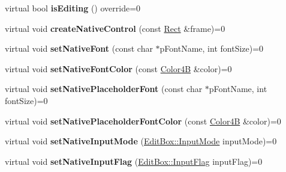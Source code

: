\begin{DoxyCompactItemize}
\item 
\mbox{\label{classui_1_1EditBoxImplCommon_adfce3b9c52fb6bcb411883ca93276c2e}} 
virtual bool {\bfseries is\+Editing} () override=0
\item 
\mbox{\label{classui_1_1EditBoxImplCommon_a44458381e57953414f07c15241fb2c2a}} 
virtual void {\bfseries create\+Native\+Control} (const \hyperlink{classRect}{Rect} \&frame)=0
\item 
\mbox{\label{classui_1_1EditBoxImplCommon_a5940a3829aa418b940e95706c75862fc}} 
virtual void {\bfseries set\+Native\+Font} (const char $\ast$p\+Font\+Name, int font\+Size)=0
\item 
\mbox{\label{classui_1_1EditBoxImplCommon_a258505288a3a49a007d0e5fc72369aae}} 
virtual void {\bfseries set\+Native\+Font\+Color} (const \hyperlink{structColor4B}{Color4B} \&color)=0
\item 
\mbox{\label{classui_1_1EditBoxImplCommon_af4db6938a72cf224f975892b9b0468b1}} 
virtual void {\bfseries set\+Native\+Placeholder\+Font} (const char $\ast$p\+Font\+Name, int font\+Size)=0
\item 
\mbox{\label{classui_1_1EditBoxImplCommon_a9f3f493c2d2fee06c375e011e61db671}} 
virtual void {\bfseries set\+Native\+Placeholder\+Font\+Color} (const \hyperlink{structColor4B}{Color4B} \&color)=0
\item 
\mbox{\label{classui_1_1EditBoxImplCommon_a7df198dc2dad0413a75f4ad43e0f0c63}} 
virtual void {\bfseries set\+Native\+Input\+Mode} (\hyperlink{classui_1_1EditBox_a7a1bfe8f3ba218bedfcf5451ec3ce01a}{Edit\+Box\+::\+Input\+Mode} input\+Mode)=0
\item 
\mbox{\label{classui_1_1EditBoxImplCommon_ad802d49a85c44e5898330a729374a6cb}} 
virtual void {\bfseries set\+Native\+Input\+Flag} (\hyperlink{classui_1_1EditBox_af02f13ee9fba51d59bb3111e200848c8}{Edit\+Box\+::\+Input\+Flag} input\+Flag)=0
\item 
\mbox{\label{classui_1_1EditBoxImplCommon_a0ca8ae6b061946c5c024ff217418d874}} 

\end{DoxyCompactItemize}

